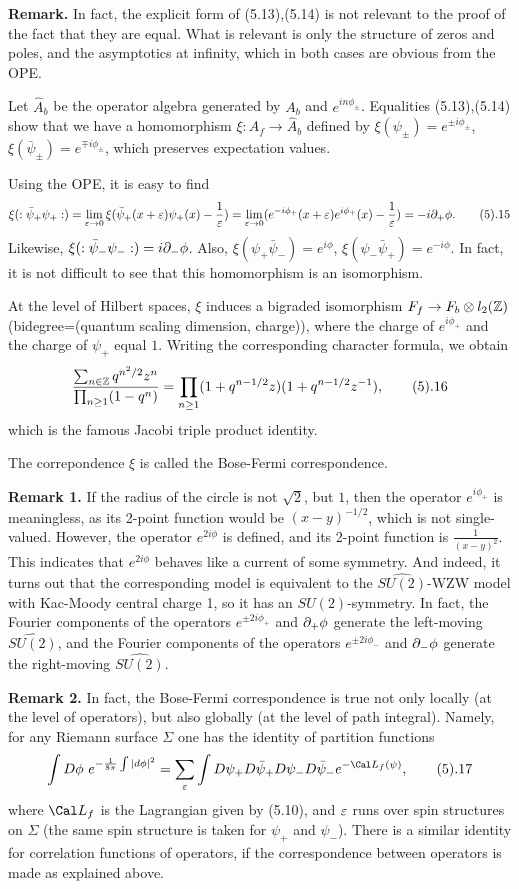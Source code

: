 {\bf Remark.} In fact, the explicit form of (5.13),(5.14) is not relevant to 
the proof of the fact that they are equal. What is relevant is only the 
structure of zeros and poles, and the asymptotics at infinity, 
which in both cases are obvious from the OPE. 

Let $\hat A_b$ be the operator algebra generated 
by $A_b$ and $e^{in\phi_\pm}$. Equalities (5.13),(5.14) show that 
we have  a homomorphism $\xi: A_f\to \hat A_b$ defined by 
$\xi(\psi_\pm)=e^{\pm i\phi_\pm}$, $\xi(\bar\psi_\pm)=e^{\mp i\phi_\pm}$, 
which preserves expectation values. 

Using the OPE, it is easy to find
$$
\xi(:\bar\psi_+\psi_+:)=\lim_{\e\to 0}\xi
(\bar\psi_+(x+\e)\psi_+(x)-\frac{1}{\e})=
\lim_{\e\to 0}(e^{-i\phi_+}(x+\e)e^{i\phi_+}(x)-\frac{1}{\e})=
-i\d_+\phi.\tag 5.15
$$
Likewise, $\xi(:\bar\psi_-\psi_-:)=i\partial_-\phi$. 
Also, $\xi(\psi_+\bar\psi_-)=e^{i\phi}$, $\xi(\psi_-\bar\psi_+)=
e^{-i\phi}$. 
In fact, it is not difficult to see 
that this homomorphism is an isomorphism. 

At the level of Hilbert spaces, $\xi$ induces a 
bigraded isomorphism $F_f\to F_b\otimes l_2(\Bbb Z)$
(bidegree=(quantum scaling dimension, charge)), where
the charge of $e^{i\phi_+}$ and the charge of $\psi_+$ 
equal $1$. Writing the corresponding character formula, we obtain
$$
\frac{\sum_{n\in\Z}q^{n^2/2}z^n}{\prod_{n\ge 1}(1-q^n)}=
\prod_{n\ge 1}(1+q^{n-1/2}z)(1+q^{n-1/2}z^{-1}),\tag 5.16
$$
which is the famous Jacobi triple product identity. 

The correpondence $\xi$ is called the Bose-Fermi correspondence.

{\bf Remark 1.} If the radius of the circle is not $\sqrt{2}$, but $1$, then 
the operator $e^{i\phi_+}$ is meaningless, as its 2-point function 
would be $(x-y)^{-1/2}$, which is not single-valued. However, the operator
$e^{2i\phi}$ is defined, and its 2-point function is $\frac{1}{(x-y)^2}$. 
This indicates that $e^{2i\phi}$ behaves like a current of some symmetry. 
And indeed, it turns out that the corresponding model is equivalent to 
the $\widehat{SU(2)}$-WZW model with Kac-Moody central charge 1, 
so it has an $SU(2)$-symmetry. In fact, the Fourier components 
of the operators 
$e^{\pm 2i\phi_+}$ and $\partial_+\phi$ generate the left-moving $\widehat{SU(2)}$, 
and the  Fourier components 
of the operators 
$e^{\pm 2i\phi_-}$ and $\partial_-\phi$ generate the right-moving $\widehat{SU(2)}$.
  
{\bf Remark 2.}
In fact, the Bose-Fermi correspondence is true not only locally (at the level 
of operators), but also globally (at the level of path integral). Namely, 
for any Riemann surface $\Sigma$ one has the identity of partition functions
$$
\int D\phi\ e^{-\frac{1}{8\pi}\int |d\phi|^2}=
\sum_{\e}
\int D\psi_+D\bar\psi_+D\psi_-D\bar\psi_- e^{-\Cal L_f(\psi)},\tag 5.17
$$
where $\Cal L_f$ is the Lagrangian given by (5.10), and $\varepsilon$ runs over spin 
structures on $\Sigma$ (the same spin structure is taken for $\psi_+$ and 
$\psi_-$). There is a similar identity for correlation 
functions of operators, if the correspondence between operators is made
as explained above.   

